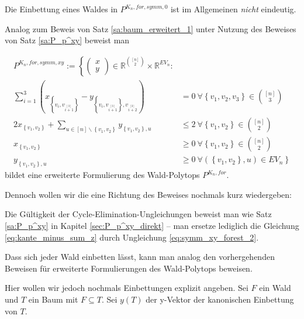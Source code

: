 \documentclass[10p,a4paper,BCOR = 12mm, DIV=15]{scrbook}
\begin{document}
{\begin{Kor}
Die Einbettung eines Waldes in $P^{K_n, for, symm, 0}$ ist im Allgemeinen \emph{nicht} eindeutig.
\end{Kor}

Analog zum Beweis von Satz \ref{sa:baum_erweitert_1} unter Nutzung des Beweises von Satz \ref{sa:P_p^xy} beweist man
\begin{Sa}
\label{sa:wald_xy}
\begin{align}
P^{K_n, for, symm, xy} := \left\{ \left(\begin{array}{c}
x \\
y
\end{array}\right)\in\mathbb{R}^{[n]\choose 2}\times \mathbb{R}^{EV_n}: \right.
\nonumber \\
\sum_{i=1}^3 \left(x_{\left\{v_{i}, v_{i \stackrel{\left[3\right]}{+} 1}\right\}} -  y_{\left\{v_{i}, v_{i \stackrel{\left[3\right]}{+} 1}\right\}, v_{i \stackrel{\left[3\right]}{+} 2}}\right) & = 0\ \forall \left\{v_1, v_2, v_3\right\}\in {[n] \choose 3} \label{eq:symm_xy_forest_1} \\
2 x_{\left\{v_1, v_2\right\}} + \sum_{u\in[n]\backslash\left\{v_1, v_2\right\}} y_{\left\{v_1, v_2\right\}, u} & \leq 2\ \forall \left\{v_1, v_2\right\}\in {[n] \choose 2} \label{eq:symm_xy_forest_2} \\
x_{\left\{v_1, v_2\right\}} & \geq 0\ \forall \left\{v_1, v_2\right\}\in {[n] \choose 2} \nonumber \\
y_{\left\{v_1, v_2\right\}, u} & \geq 0\ \forall \left(\left\{v_1, v_2\right\}, u\right) \in EV_n \left.\right\} \nonumber
\end{align}
bildet eine erweiterte Formulierung des Wald-Polytops $P^{K_n, for}$.
\end{Sa}

Dennoch wollen wir die eine Richtung des Beweises nochmals kurz wiedergeben:
\begin{bew}
Die Gültigkeit der Cycle-Elimination-Ungleichungen beweist man wie Satz \ref{sa:P_p^xy} in Kapitel \ref{sec:P_p^xy_direkt} -- man ersetze lediglich die Gleichung \eqref{eq:kante_minus_sum_z} durch Ungleichung \eqref{eq:symm_xy_forest_2}.

Dass sich jeder Wald einbetten lässt, kann man analog den vorhergehenden Beweisen für erweiterte Formulierungen des Wald-Polytops beweisen.

Hier wollen wir jedoch nochmals Einbettungen explizit angeben. Sei $F$ ein Wald und $T$ ein Baum mit $F \subseteq T$. Sei $y\left(T\right)$ der y-Vektor der kanonischen Einbettung von $T$.


\end{bew}}
\end{document}
